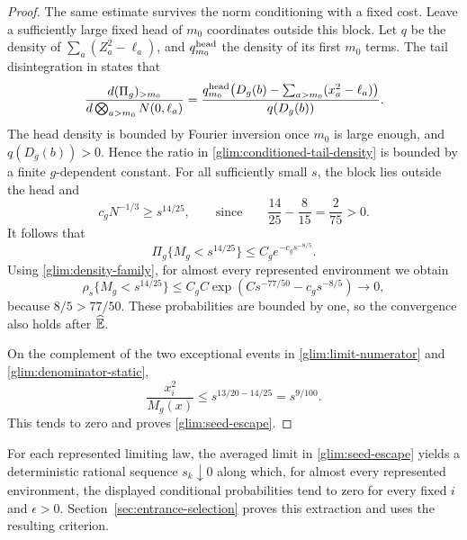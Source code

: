 \begin{proof}
The same estimate survives the norm conditioning with a fixed cost.
Leave a sufficiently large fixed head of \(m_0\) coordinates outside
this block.  Let \(q\) be the density of
\(\sum_a(Z_a^2-\ell_a)\), and \(q_{m_0}^{\rm head}\) the density of its
first \(m_0\) terms.  The tail disintegration in
\cite[Proposition~2.3]{FUA} states that
\begin{equation}
 \frac{d(\Pi_g)_{>m_0}}{d\bigotimes_{a>m_0}N(0,\ell_a)}
 =
 \frac{q_{m_0}^{\rm head}\!\left(
 D_g(b)-\sum_{a>m_0}(x_a^2-\ell_a)\right)}{q(D_g(b))}.
 \label{glim:conditioned-tail-density}
\end{equation}
The head density is bounded by Fourier inversion once \(m_0\) is
large enough, and \(q(D_g(b))>0\).  Hence the ratio in
\eqref{glim:conditioned-tail-density} is bounded by a finite
\(g\)-dependent constant.  For all sufficiently small \(s\), the
block lies outside the head and
\[
 c_g N^{-1/3}\ge s^{14/25},
 \qquad\text{since}\qquad
 \frac{14}{25}-\frac8{15}=\frac2{75}>0.
\]
It follows that
\begin{equation}
 \Pi_g\{M_g<s^{14/25}\}\le C_g e^{-c_g s^{-8/5}}.
 \label{glim:denominator-static}
\end{equation}
Using \eqref{glim:density-family}, for almost every represented
environment we obtain
\[
 \rho_s\{M_g<s^{14/25}\}
 \le C_g C\exp\!\left(C s^{-77/50}-c_gs^{-8/5}\right)
 \longrightarrow0,
\]
because \(8/5>77/50\).  These probabilities are bounded by one, so
the convergence also holds after \(\widehat{\mathbb E}\).

On the complement of the two exceptional events in
\eqref{glim:limit-numerator} and \eqref{glim:denominator-static},
\[
 \frac{x_i^2}{M_g(x)}
 \le s^{13/20-14/25}=s^{9/100}.
\]
This tends to zero and proves \eqref{glim:seed-escape}.
\end{proof}

For each represented limiting law, the averaged limit in
\eqref{glim:seed-escape} yields a deterministic rational sequence
\(s_k\downarrow0\) along which, for almost every represented
environment, the displayed conditional probabilities tend to zero
for every fixed \(i\) and \(\epsilon>0\).
Section~\ref{sec:entrance-selection} proves this extraction and uses
the resulting criterion.

